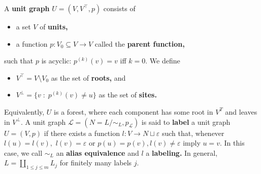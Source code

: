 \begin{definition}
  A \textbf{unit graph} $U = (V, V^{\top}, p)$ consists of
  \begin{itemize}
    \item a set $V$ of \textbf{units,}
    \item a function $p: V_{0} \subseteq V \to V$ called the \textbf{parent function,}
  \end{itemize}
  such that $p$ is acyclic: $p^{(k)}(v) = v$ iff $k = 0$. We define

  \begin{itemize}
  \item $V^{\top} = V \setminus V_{0}$ as the set of \textbf{roots,} and
  \item $V^{\bot} = \{v \;:\; p^{(k)}(v) \neq u \}$ as the set of \textbf{sites.}
  \end{itemize}
  Equivalently, $U$ is a forest, where each component has some root in $V^{T}$ and leaves in $V^{\bot}.$
  A unit graph $\mathcal{L} = (N = L / \sim_{L}, p_{\mathcal{L}})$ is said to \textbf{label} a unit graph $U = (V, p)$
  if there exists a function $l: V \to N \sqcup \varepsilon$ such that, whenever $l(u) = l(v),$ $l(v) = \varepsilon$ or $p(u) = p(v), l(v) \neq \varepsilon$ imply $u = v.$ In this case, we call $\sim_{L}$ an \textbf{alias equivalence} and $l$ a \textbf{labeling.} In general, $L = \coprod_{1 \leq j \leq m}L_{j}$ for finitely many labels $j.$

\end{definition}

